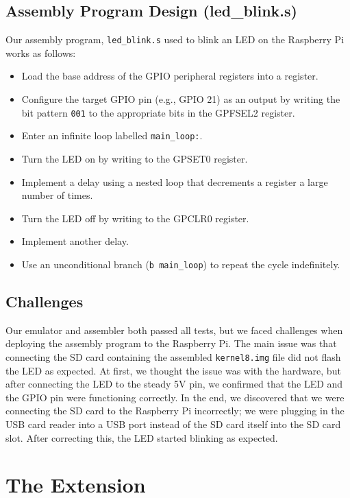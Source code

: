 \documentclass[11pt]{article}
\begin{document}
\subsection{Assembly Program Design (led\_blink.s)}
Our assembly program, \texttt{led\_blink.s} used to blink an LED on the Raspberry Pi works as follows:
\begin{itemize}
    \item Load the base address of the GPIO peripheral registers into a register.
    \item Configure the target GPIO pin (e.g., GPIO 21) as an output by writing the bit pattern \texttt{001} to the appropriate bits in the GPFSEL2 register.
    \item Enter an infinite loop labelled \texttt{main\_loop:}.
    \item Turn the LED on by writing to the GPSET0 register.
    \item Implement a delay using a nested loop that decrements a register a large number of times.
    \item Turn the LED off by writing to the GPCLR0 register.
    \item Implement another delay.
    \item Use an unconditional branch (\texttt{b main\_loop}) to repeat the cycle indefinitely.
\end{itemize}

\subsection{Challenges}
Our emulator and assembler both passed all tests, but we faced challenges when deploying the assembly program to the Raspberry Pi.
The main issue was that connecting the SD card containing the assembled 
\texttt{kernel8.img} file did not flash the LED as expected.
At first, we thought the issue was with the hardware, but after connecting the LED to the steady 5V pin, 
we confirmed that the LED and the GPIO pin were functioning correctly.
In the end, we discovered that we were connecting the SD card to the Raspberry Pi incorrectly;
we were plugging in the USB card reader into a USB port instead of the SD card itself into the SD card slot.
After correcting this, the LED started blinking as expected.

\section{The Extension}
\end{document}
